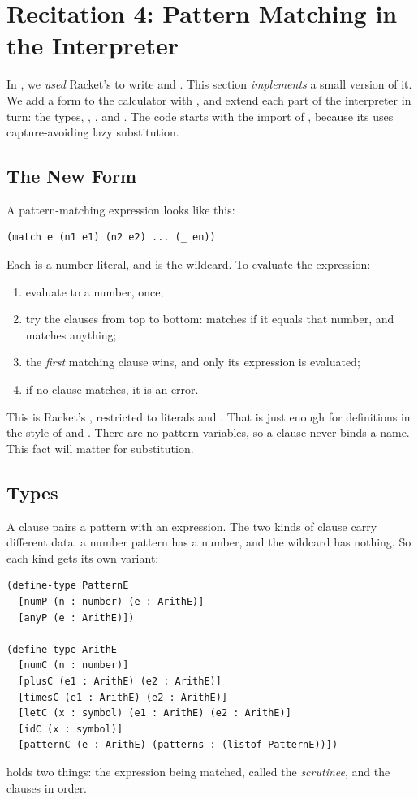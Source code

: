 \section{Recitation 4: Pattern Matching in the Interpreter}
\label{sec:rec4}

In , we \emph{used} Racket's  to write  and . This section \emph{implements} a small version of it. We add a  form to the calculator with , and extend each part of the interpreter in turn: the types, , , and . The code starts with the  import of , because its  uses capture-avoiding lazy substitution.

\subsection{The New Form}

A pattern-matching expression looks like this:
\begin{lstlisting}[style=repl]
(match e (n1 e1) (n2 e2) ... (_ en))
\end{lstlisting}
Each  is a number literal, and \code{\_} is the wildcard. To evaluate the expression:
\begin{enumerate}
  \item evaluate  to a number, once;
  \item try the clauses from top to bottom:  matches if it equals that number, and \code{\_} matches anything;
  \item the \emph{first} matching clause wins, and only its expression is evaluated;
  \item if no clause matches, it is an error.
\end{enumerate}
This is Racket's , restricted to literals and \code{\_}. That is just enough for definitions in the style of  and . There are no pattern variables, so a clause never binds a name. This fact will matter for substitution.

\subsection{Types}

A clause pairs a pattern with an expression. The two kinds of clause carry different data: a number pattern has a number, and the wildcard has nothing. So each kind gets its own variant:
\begin{lstlisting}
(define-type PatternE
  [numP (n : number) (e : ArithE)]
  [anyP (e : ArithE)])

(define-type ArithE
  [numC (n : number)]
  [plusC (e1 : ArithE) (e2 : ArithE)]
  [timesC (e1 : ArithE) (e2 : ArithE)]
  [letC (x : symbol) (e1 : ArithE) (e2 : ArithE)]
  [idC (x : symbol)]
  [patternC (e : ArithE) (patterns : (listof PatternE))])
\end{lstlisting}
 holds two things: the expression being matched, called the \emph{scrutinee}, and the clauses in order.

